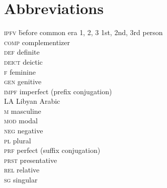 \documentclass[output=paper]{langsci/langscibook}
\begin{document}
\section*{Abbreviations}
\setlength{\columnsep}{30pt}
\begin{multicols}{2}
\begin{tabbing}
\textsc{ipfv} \hspace{1em} \= before common era\kill
\textsc{1, 2, 3} \> 1st, 2nd, 3rd person \\
\textsc{comp} \> {complementizer} \\
\textsc{def} \> {definite} \\
\textsc{deict} \> deictic \\
\textsc{f} \> feminine \\
\textsc{gen} \> genitive \\
\textsc{impf} \> imperfect (prefix conjugation) \\
LA \> Libyan Arabic \\
\textsc{m} \> masculine \\
\textsc{mod} \> {modal} \\
\textsc{neg} \> negative \\
\textsc{pl} \> plural \\
\textsc{prf} \> perfect (suffix conjugation) \\
\textsc{prst} \> presentative \\
\textsc{rel} \> {relative} \\
\textsc{sg} \> singular
\end{tabbing}
\end{multicols}


\sloppy
\printbibliography[heading=subbibliography,notkeyword=this]
\end{document}
